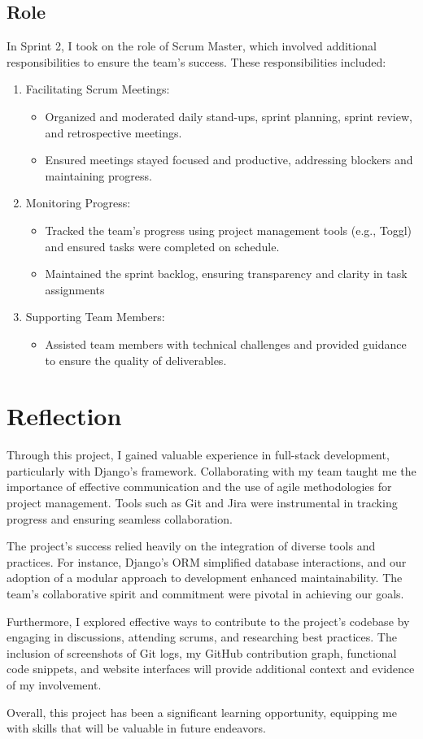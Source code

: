 \documentclass[a4paper,12pt]{article}
\begin{document}
\subsection{Role}
In Sprint 2, I took on the role of Scrum Master, which involved additional responsibilities to ensure the
team’s success. These responsibilities included:
\begin{enumerate}
    \item Facilitating Scrum Meetings:
        \begin{itemize}
            \item Organized and moderated daily stand-ups, sprint planning, sprint review, and retrospective meetings.
            \item Ensured meetings stayed focused and productive, addressing blockers and maintaining progress.
        \end{itemize}
    \item Monitoring Progress:
        \begin{itemize}
            \item Tracked the team’s progress using project management tools (e.g., Toggl) and ensured tasks were completed on schedule.
            \item Maintained the sprint backlog, ensuring transparency and clarity in task assignments
        \end{itemize}
    \item Supporting Team Members:
        \begin{itemize}
            \item Assisted team members with technical challenges and provided guidance to ensure the quality of deliverables.
        \end{itemize}
\end{enumerate}
\newpage
\section{Reflection}
Through this project, I gained valuable experience in full-stack development, particularly with Django’s
framework. Collaborating with my team taught me the importance of effective communication and the use of agile
methodologies for project management. Tools such as Git and Jira were instrumental in tracking progress and
ensuring seamless collaboration.

The project’s success relied heavily on the integration of diverse tools and practices. For instance, Django’s
ORM simplified database interactions, and our adoption of a modular approach to development enhanced
maintainability. The team’s collaborative spirit and commitment were pivotal in achieving our goals.

Furthermore, I explored effective ways to contribute to the project’s codebase by engaging in discussions,
attending scrums, and researching best practices. The inclusion of screenshots of Git logs, my GitHub
contribution graph, functional code snippets, and website interfaces will provide additional context and
evidence of my involvement.

Overall, this project has been a significant learning opportunity, equipping me with skills that will be
valuable in future endeavors.
\end{document}
